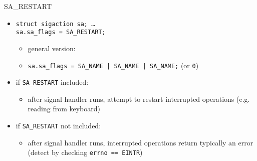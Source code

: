 
\begin{frame}{SA\_RESTART}
    \begin{itemize}
    \item \texttt{struct sigaction sa; \ldots} \\\texttt{sa.sa\_flags = SA\_RESTART;}
        \begin{itemize}
        \item general version:
        \item \texttt{sa.sa\_flags = SA\_NAME | SA\_NAME | SA\_NAME;} (or \texttt{0})
        \end{itemize}
    \item if \texttt{SA\_RESTART} included:
        \begin{itemize}
        \item after signal handler runs, attempt to restart interrupted operations
                (e.g. reading from keyboard)
        \end{itemize}
    \item if \texttt{SA\_RESTART} not included:
        \begin{itemize}
        \item after signal handler runs, interrupted operations return
            typically an error (detect by checking \texttt{errno == EINTR})
        \end{itemize}
    \end{itemize}
\end{frame}
